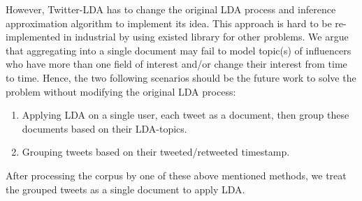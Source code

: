 \documentclass[conference,compsoc]{IEEEtran}
\begin{document}
However, Twitter-LDA has to change the original LDA process and inference approximation algorithm to implement its idea. This approach is hard to be re-implemented in industrial by using existed library for other problems. We argue that aggregating into a single document may fail to model topic(s) of influencers who have more than one field of interest and/or change their interest from time to time. Hence, the two following scenarios should be the future work to solve the problem without modifying the original LDA process:
\begin{enumerate}
	\item Applying LDA on a single user, each tweet as a document, then group these documents based on their LDA-topics.
	\item Grouping tweets based on their tweeted/retweeted timestamp.
\end{enumerate}
After processing the corpus by one of these above mentioned methods, we treat the grouped tweets as a single document to apply LDA.




%
%
%


\end{document}
